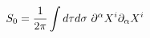 \begin{equation}
 S_{0 }= {1\over 2\pi} \int d\tau d\sigma 
  ~\partial^\alpha X^i \partial_\alpha X^i
\end{equation}

